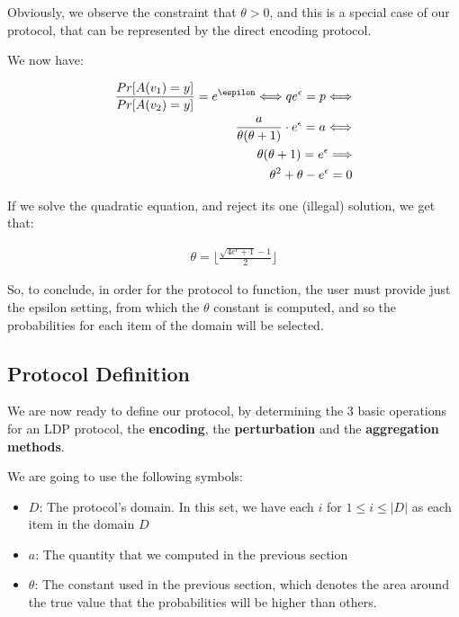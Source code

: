 Obviously, we observe the constraint that $\theta > 0$, and this is a special case of our protocol, that can be represented by the direct encoding protocol.

We now have:

\begin{align*}
    \frac{Pr[A(v_1) = y]}{Pr[A(v_2) = y]} = e^{\espilon} \Longleftrightarrow 
    q e^{\epsilon} = p \Longleftrightarrow \\
    \frac{a}{\theta(\theta + 1)} \cdot e^{\epsilon} =  a \Longleftrightarrow \\
    \theta(\theta + 1) = e^{\epsilon} \Longrightarrow \\
    \theta^2 + \theta - e^\epsilon = 0
\end{align*}

If we solve the quadratic equation, and reject its one (illegal) solution, we get that:

\begin{align}
    \theta = \lfloor \frac{\sqrt{4e^{\epsilon} + 1} - 1}{2}\rfloor
\end{align}

So, to conclude, in order for the protocol to function, the user must provide just the epsilon setting, from which the $\theta$ constant is computed, and so the probabilities for each item of the domain will be selected.  


\subsection{Protocol Definition}

We are now ready to define our protocol, by determining the 3 basic operations for an LDP protocol, the \textbf{encoding}, the \textbf{perturbation} and the \textbf{aggregation methods}.


We are going to use the following symbols:
\begin{itemize}
    \item $D$: The protocol's domain. In this set, we have each $i$ for $1 \leq i \leq |D|$ as each item in the domain $D$
    \item $a$: The quantity that we computed in the previous section
    \item $\theta$: The constant used in the previous section, which denotes the area around the true value that the probabilities will be higher than others.
    
\end{itemize}

